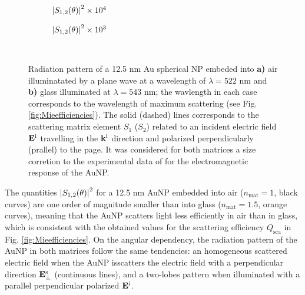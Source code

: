 \begin{figure}[h!]
	\def\svgwidth{.9\textwidth} \small\centering
		\vspace*{3.25em}
		\hspace*{-.25\textwidth}
	\begin{subfigure}{.25\textwidth}%
		\caption{$\abs{S_{1,2}(\theta)}^2\times 10^4$} \label{fig:ScatteringMaps:a}%
		\end{subfigure}%
	\begin{subfigure}{.45\textwidth}%
		\caption{$\abs{S_{1,2}(\theta)}^2\times 10^3$}\label{fig:ScatteringMaps:b}%
		\end{subfigure}%
	\vspace*{-6.25em}\\
	\vspace*{-.5em}
	\caption[Radiation Pattern of a 12.5 nm Au Spherical NP embeded into Air and Glass]{Radiation pattern of a 12.5 nm Au spherical NP embeded into \textbf{a)} air illuminatated by a plane wave at a wavelength of $\lambda = 522$ nm and \textbf{b)} glass illuminated at $\lambda = 543$ nm; the wavlength in each case corresponds to the wavelength of maximum scattering (see Fig. \ref{fig:Mieefficiencies}). The solid (dashed) lines corresponds to the scattering matrix element $S_1$ ($S_2$) related to an incident electric field $\vb{E}^\text{i}$ travelling in the $\vb{k}^\text{i}$ direction  and polarized perpendicularly (prallel) to the page. It was considered for both matrices a size corretion to the experimental data of \citeauthor{johnson_optical_1972} \cite{johnson_optical_1972} for the electromagnetic response of the AuNP.}
	\label{fig:ScatteringMaps}
 \end{figure}

The quantities $\abs{S_{1,2}(\theta)}^2$ for a 12.5 nm AuNP embedded into air ($n_\text{mat} = 1$, black curves) are one order of magnitude smaller  than into glass ($n_\text{mat} = 1.5$, orange curves), meaning that the AuNP scatters light less efficiently in air than in glass, which is consistent with the obtained values for the scattering efficiency $Q_\text{sca}$ in Fig. \ref{fig:Mieefficiencies}. On the angular dependency, the radiation pattern of the AuNP in both matrices follow the same tendencies: an homogeneous scattered electric field when the AuNP isscatters the electric field with a perpendicular direction  $\vb{E}^\text{s}_\perp$ (continuous lines), and a two-lobes pattern when illuminated with a parallel perpendicular polarized $\vb{E}^\text{i}$.
